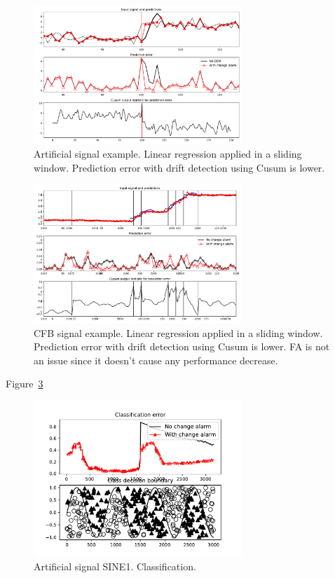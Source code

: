 \documentclass[12 pt]{article}
\begin{document}
  \begin{figure}[!htb]
    \centering
    \includegraphics[width=0.7\textwidth]{images/proof_of_concept_linreg_art_sig}
    \caption{Artificial signal example. Linear regression applied in a sliding window. Prediction error with drift detection using Cusum is lower.}\label{fig:art_sig_example}
  \end{figure}
  \begin{figure}[!htb]
    \centering
    \includegraphics[width=0.7\textwidth]{images/proof_of_concept_linreg_cfb_sig}
    \caption{CFB signal example.  Linear regression applied in a sliding window.  Prediction error with drift detection using Cusum is lower.  FA is not an issue since it doesn't cause any performance decrease.}\label{fig:cfb_sig_linreg_proof_of_concept}
  \end{figure}

  Figure~\ref{fig:sine1_example}
  \begin{figure}[!htb]
    \centering
    \includegraphics[width=0.7\textwidth]{images/proof_of_concept_dt_sine1}
    \caption{Artificial signal SINE1. Classification.}\label{fig:sine1_example}
  \end{figure}
\end{document}
